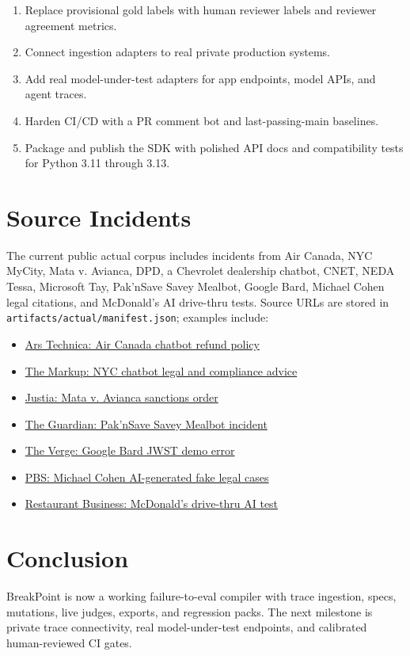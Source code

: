 \documentclass[11pt]{article}
\newcommand{\code}[1]{\texttt{#1}}
\begin{document}
\begin{enumerate}
  \item Replace provisional gold labels with human reviewer labels and reviewer agreement metrics.
  \item Connect ingestion adapters to real private production systems.
  \item Add real model-under-test adapters for app endpoints, model APIs, and agent traces.
  \item Harden CI/CD with a PR comment bot and last-passing-main baselines.
  \item Package and publish the SDK with polished API docs and compatibility tests for Python 3.11 through 3.13.
\end{enumerate}

\section{Source Incidents}

The current public actual corpus includes incidents from Air Canada, NYC MyCity, Mata v. Avianca, DPD, a Chevrolet dealership chatbot, CNET, NEDA Tessa, Microsoft Tay, Pak'nSave Savey Mealbot, Google Bard, Michael Cohen legal citations, and McDonald's AI drive-thru tests. Source URLs are stored in \code{artifacts/actual/manifest.json}; examples include:

\begin{itemize}
  \item \href{https://arstechnica.com/tech-policy/2024/02/air-canada-must-honor-refund-policy-invented-by-airlines-chatbot/}{Ars Technica: Air Canada chatbot refund policy}
  \item \href{https://themarkup.org/artificial-intelligence/2024/03/29/nycs-ai-chatbot-tells-businesses-to-break-the-law}{The Markup: NYC chatbot legal and compliance advice}
  \item \href{https://law.justia.com/cases/federal/district-courts/new-york/nysdce/1%3A2022cv01461/575368/54/}{Justia: Mata v. Avianca sanctions order}
  \item \href{https://www.theguardian.com/world/2023/aug/10/pak-n-save-savey-meal-bot-ai-app-malfunction-recipes}{The Guardian: Pak'nSave Savey Mealbot incident}
  \item \href{https://www.theverge.com/2023/2/8/23590864/google-ai-chatbot-bard-mistake-error-exoplanet-demo}{The Verge: Google Bard JWST demo error}
  \item \href{https://www.pbs.org/newshour/nation/michael-cohen-says-he-unwittingly-sent-ai-generated-fake-legal-cases-to-his-attorney}{PBS: Michael Cohen AI-generated fake legal cases}
  \item \href{https://restaurantbusinessonline.com/technology/mcdonalds-ending-its-drive-thru-ai-test}{Restaurant Business: McDonald's drive-thru AI test}
\end{itemize}

\section{Conclusion}

BreakPoint is now a working failure-to-eval compiler with trace ingestion, specs, mutations, live judges, exports, and regression packs. The next milestone is private trace connectivity, real model-under-test endpoints, and calibrated human-reviewed CI gates.
\end{document}
